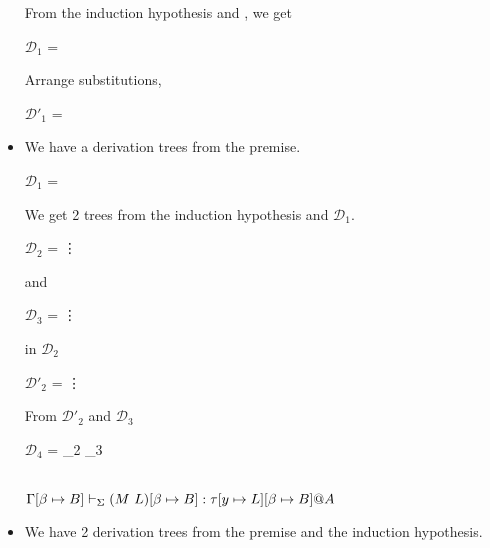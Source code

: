 \begin{itemize}
	      From the induction hypothesis and \TAbs, we get
	      	      
	      $\mathcal{D}_1$ = 
	      { \andalso {}}
	      	      
	      Arrange substitutions,
	      	      
	      $\mathcal{D}'_1$ = 
	      { \andalso {}}
	      	      
	\item \TApp
	      	      
	      We have a derivation trees from the premise.
	      	      
	      $\mathcal{D}_1$ = 
	      {}
	      	      
	      We get 2 trees from the induction hypothesis and $\mathcal{D}_1$.
	      	      
	      $\mathcal{D}_2$ = 
	      {\vdots}
	      	      
	      and
	      	      
	      $\mathcal{D}_3$ = 
	      {\vdots}
	      	      
	       in $\mathcal{D}_2$
	      	      
	      $\mathcal{D'}_2$ = 
	      {\vdots}
	      	      
	      From $\mathcal{D'}_2$ and $\mathcal{D}_3$
	      	      
	      $\mathcal{D}_4$ = 
	      {_2 \andalso {}_3}
	      	      
	       \\
	      $\GGV (M\ L)\SB: \tau[y \mapsto L]\SB@A$
	      	      
	\item \TConv
	      	      
	      We have 2 derivation trees from the premise and the induction hypothesis.
	      	      

\end{itemize}

